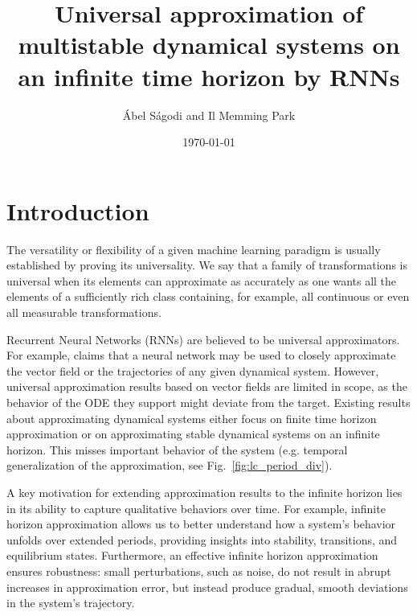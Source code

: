 \documentclass{article}
\title{Universal approximation of multistable dynamical systems on an infinite time horizon by RNNs}
\author{\'Abel S\'agodi and Il Memming Park}
\date{\today}
\theoremstyle{definition}
\theoremstyle{remark}
\newcounter{ct}
\begin{document}
\maketitle

\section{Introduction}
The versatility or flexibility of a given machine learning paradigm is usually established by proving its universality.
We say that a family of transformations is universal when its elements can approximate as accurately as one wants all the elements of a sufficiently rich class containing, for example, all continuous or even all measurable transformations.


Recurrent Neural Networks (RNNs) are believed to be universal approximators.
For example, \citet{durstewitz2023reconstructing} claims that 
 a neural network may be used to closely approximate the vector field or the trajectories of any given dynamical system.
However, universal approximation results based on vector fields are limited in scope, as the behavior of the ODE they support might deviate from the target.
Existing results about approximating dynamical systems either focus on finite time horizon approximation or on approximating stable dynamical systems on an infinite horizon.
This misses important behavior of the system (e.g. temporal generalization of the approximation, see Fig.~\ref{fig:lc_period_div}).

A key motivation for extending approximation results to the infinite horizon lies in its ability to capture qualitative behaviors over time. For example, infinite horizon approximation allows us to better understand how a system's behavior unfolds over extended periods, providing insights into stability, transitions, and equilibrium states.
 Furthermore, an effective infinite horizon approximation ensures robustness: small perturbations, such as noise, do not result in abrupt increases in approximation error, but instead produce gradual, smooth deviations in the system's trajectory.
\end{document}
